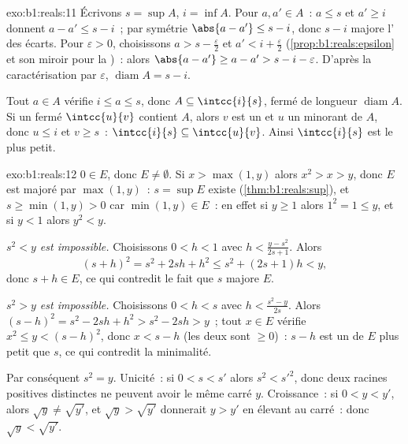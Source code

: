 \begin{solution}{exo:b1:reals:11}
Écrivons $s = \sup A$, $i = \inf A$. Pour $a, a' \in A$~: $a \leq
s$ et $a' \geq i$ donnent $a - a' \leq s - i$~; par symétrie
$\abs{a - a'} \leq s - i$, donc $s - i$ majore l' des
écarts. Pour $\varepsilon > 0$, choisissons $a > s -
\frac\varepsilon2$ et $a' < i + \frac\varepsilon2$
(\cref{prop:b1:reals:epsilon} et son miroir pour la )~: alors $\abs{a - a'} \geq a - a' > s - i -
\varepsilon$. D'après la caractérisation par $\varepsilon$,
$\operatorname{diam} A = s - i$.

Tout $a \in A$ vérifie $i \leq a \leq s$, donc $A \subseteq
\intcc{i}{s}$,  fermé de longueur $\operatorname{diam}
A$. Si un  fermé $\intcc{u}{v}$ contient $A$, alors $v$
est un  et $u$ un minorant de $A$, donc $u \leq i$ et $v
\geq s$~: $\intcc{i}{s} \subseteq \intcc{u}{v}$. Ainsi
$\intcc{i}{s}$ est le plus petit.
\end{solution}

\begin{solution}{exo:b1:reals:12}
$0 \in E$, donc $E \neq \emptyset$. Si $x > \max(1, y)$ alors $x^2
> x > y$, donc $E$ est majoré par $\max(1, y)$~: $s = \sup E$
existe (\cref{thm:b1:reals:sup}), et $s \geq \min(1, y) > 0$
car $\min(1, y) \in E$~: en effet si $y \geq 1$ alors $1^2 = 1
\leq y$, et si $y < 1$ alors $y^2 < y$.

\emph{$s^2 < y$ est impossible.} Choisissons $0 < h < 1$ avec $h <
\frac{y - s^2}{2s + 1}$. Alors
\[
(s + h)^2 = s^2 + 2sh + h^2 \leq s^2 + (2s + 1)h < y ,
\]
donc $s + h \in E$, ce qui contredit le fait que $s$ majore $E$.

\emph{$s^2 > y$ est impossible.} Choisissons $0 < h < s$ avec $h <
\frac{s^2 - y}{2s}$. Alors $(s - h)^2 = s^2 - 2sh + h^2 > s^2 -
2sh > y$~; tout $x \in E$ vérifie $x^2 \leq y < (s - h)^2$, donc
$x < s - h$ (les deux sont $\geq 0$)~: $s - h$ est un  de
$E$ plus petit que $s$, ce qui contredit la minimalité.

Par conséquent $s^2 = y$. Unicité~: si $0 < s < s'$ alors $s^2 <
s'^2$, donc deux racines positives distinctes ne peuvent avoir le
même carré $y$. Croissance~: si $0 < y < y'$, alors $\sqrt y \neq
\sqrt{y'}$, et $\sqrt y > \sqrt{y'}$ donnerait $y > y'$ en élevant
au carré~: donc $\sqrt y < \sqrt{y'}$.
\end{solution}

